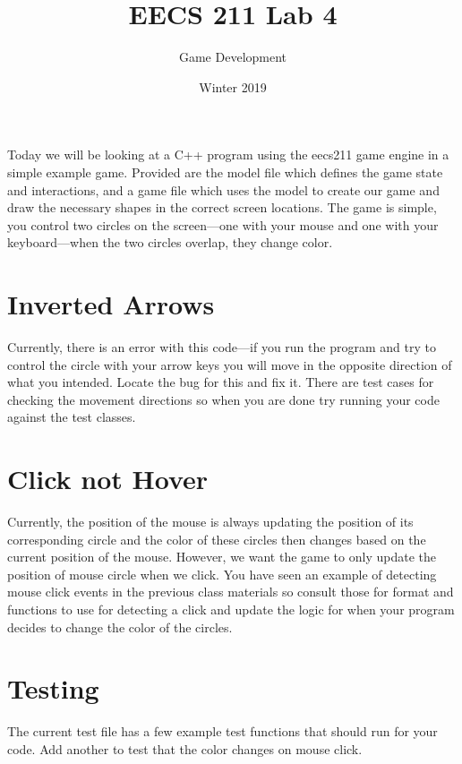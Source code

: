 \documentclass{tufte-handout}
\title{EECS 211 Lab 4}
\author{Game Development}
\date{Winter 2019}
\begin{document}
\maketitle

Today we will be looking at a C++ program using the eecs211 game engine in a simple example game. Provided are the model file which defines the game state and interactions, and a game file which uses the model to create our game and draw the necessary shapes in the correct screen locations. The game is simple, you control two circles on the screen---one with your mouse and one with your keyboard---when the two circles overlap, they change color.

\section{Inverted Arrows}

Currently, there is an error with this code---if you run the program and try to control the circle with your arrow keys you will move in the opposite direction of what you intended. Locate the bug for this and fix it. There are test cases for checking the movement directions so when you are done try running your code against the test classes.

\section{Click not Hover}

Currently, the position of the mouse is always updating the position of its corresponding circle and the color of these circles then changes based on the current position of the mouse. However, we want the game to only update the position of mouse circle when we click. You have seen an example of detecting mouse click events in the previous class materials so consult those for format and functions to use for detecting a click and update the logic for when your program decides to change the color of the circles.

\section{Testing}

The current test file has a few example test functions that should run for your code. Add another to test that the color changes on mouse click.
\end{document}
